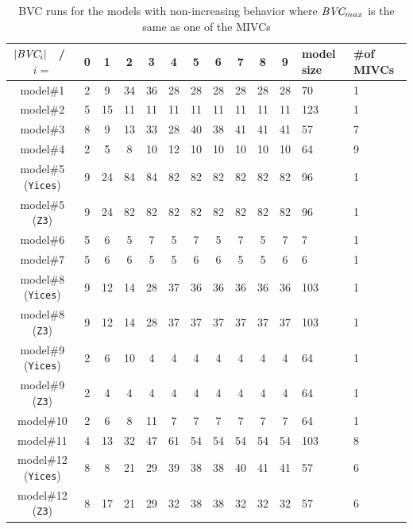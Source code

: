 \begin{table}
  \caption{BVC runs for the models with non-increasing behavior where $\textit{BVC} _{max}$ is the same as one of the MIVCs}
  \centering
  \begin{tabularx}{\linewidth}{ |c||c|c|c|c|c|c|c|c|c|c||L|L|}
    \hline
    $|\textit{BVC} _{i}|$ ~/~ $i=$ & 0 & 1 & 2 & 3 & 4 & 5 & 6 & 7 & 8 & 9 & \small{model size} & \small{\#of MIVCs} \\[0.5ex]
    \hline\hline
    
    model\#1& 2 & 9 & 34 & 36& 28 & 28 & 28 & 28 & 28 & 28 & 70&1 \\[0.5ex]
    model\#2& 5 & 15 & 11& 11& 11 & 11 & 11 & 11 & 11 & 11 & 123 &1\\[0.5ex]
    model\#3& 8 & 9& 13& 33& 28& 40& 38& 41& 41& 41&57 &7 \\[0.5ex]
    model\#4& 2& 5& 8& 10& 12& 10& 10& 10& 10& 10 &64 &9\\[0.5ex]
    \small{model\#5 (\texttt{Yices})}&9& 24 & 84& 84& 82& 82& 82& 82& 82& 82&96 &1\\[0.5ex]
    \small{model\#5 (\texttt{Z3})}& 9& 24& 82& 82& 82& 82& 82& 82& 82& 82&96 &1\\[0.5ex]
    model\#6& 5& 6& 5& 7& 5& 7& 5& 7& 5& 7& 7 &1\\[0.5ex]
    model\#7& 5& 6& 6& 5& 5& 6& 6& 5& 5& 6&6 &1\\[0.5ex]
    \small{model\#8 (\texttt{Yices})}& 9& 12& 14& 28& 37& 36& 36& 36& 36& 36&103&1 \\[0.5ex]
    \small{model\#8 (\texttt{Z3})}&9& 12& 14& 28& 37& 37& 37& 37& 37& 37& 103&1\\[0.5ex]
    \small{model\#9 (\texttt{Yices})}& 2& 6& 10& 4& 4& 4& 4& 4& 4& 4 &64&1 \\[0.5ex]
    \small{model\#9 (\texttt{Z3})}& 2& 4& 4& 4& 4& 4& 4& 4& 4& 4 &64&1\\[0.5ex]
    model\#10& 2& 6& 8& 11& 7& 7& 7& 7& 7& 7 &64&1\\[0.5ex]
    model\#11& 4& 13& 32& 47& 61& 54& 54& 54& 54& 54 &103&8 \\[0.5ex]
 \small{model\#12 (\texttt{Yices})}& 8& 8& 21& 29& 39& 38& 38& 40& 41& 41&57&6\\[0.5ex]
  \small{model\#12 (\texttt{Z3})}& 8& 17& 21& 29& 32& 38& 38& 32& 32& 32&57&6 \\[0.5ex]
    \hline
  \end{tabularx} \\
  \label{tab:bvc-abnormal}
\end{table}
      

